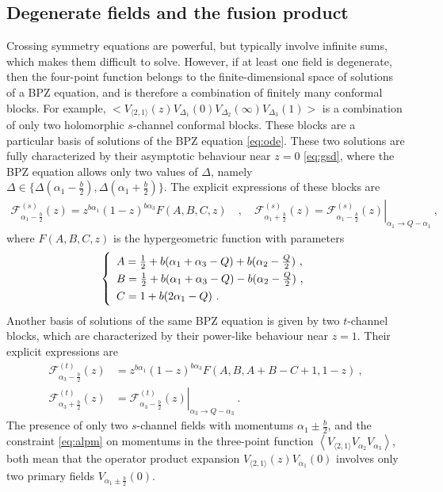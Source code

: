 \documentclass[12pt, a4paper]{article}
\theoremstyle{break}
\begin{document}
\subsection{Degenerate fields and the fusion product}

Crossing symmetry equations are powerful, but typically involve infinite sums, which makes them difficult to solve.
However, if at least one field is degenerate, then the four-point function belongs to the finite-dimensional space of solutions of a BPZ equation, and is therefore a combination of finitely many conformal blocks. 
For example,
$\Big< V_{\langle 2, 1 \rangle}(z) V_{\Delta_1}(0)V_{\Delta_2}(\infty)V_{\Delta_3}(1) \Big>$ is a combination of only two holomorphic $s$-channel conformal blocks.
These blocks are a particular basis of solutions of the BPZ equation \eqref{eq:ode}.
These two solutions are fully characterized by their asymptotic behaviour near $z=0$ \eqref{eq:gsd}, where the BPZ equation allows only two values of $\Delta$, namely $\Delta\in\{\Delta(\alpha_1-\frac{b}{2}),\Delta(\alpha_1+\frac{b}{2})\}$.
The explicit expressions of these blocks are
\begin{align}
\mathcal{F}^{(s)}_{\alpha_1-\frac{b}{2}}(z) = z^{b\alpha_1} (1-z)^{b\alpha_3} F(A,B,C,z)\quad , \quad 
 \mathcal{F}^{(s)}_{\alpha_1+\frac{b}{2}}(z) = \left. \mathcal{F}^{(s)}_{\alpha_1-\frac{b}{2}}(z) \right|_{\alpha_1\to Q-\alpha_1} \ ,
\label{gpm}
\end{align}
where $F(A,B,C,z)$ is the hypergeometric function with parameters
\begin{align}
\renewcommand{\arraystretch}{1.3}
\left\{\begin{array}{l}   A = \frac12 + b(\alpha_1+\alpha_3-Q) + b(\alpha_2-\tfrac{Q}{2}) \ , \\
      B = \frac12 + b(\alpha_1+\alpha_3-Q) - b(\alpha_2-\tfrac{Q}{2}) \ , \\
      C = 1 + b(2\alpha_1-Q) \ .
\end{array}\right. 
\label{abc}
\end{align}
Another basis of solutions of the same BPZ equation is given by two $t$-channel blocks, which are characterized by their power-like behaviour near $z=1$. Their explicit expressions are 
\begin{align}
 \mathcal{F}^{(t)}_{\alpha_3-\frac{b}{2}}(z) &= z^{b\alpha_1} (1-z)^{b\alpha_3} F(A,B,A+B-C+1,1-z)\ ,
 \nonumber \\
 \mathcal{F}^{(t)}_{\alpha_3+\frac{b}{2}}(z) &= \left. \mathcal{F}^{(t)}_{\alpha_3-\frac{b}{2}}(z) \right|_{\alpha_3\to Q-\alpha_3} \ .
\end{align}
The presence of only two $s$-channel fields with momentums $\alpha_1\pm \frac{b}{2}$, and the constraint \eqref{eq:alpm} on momentums in the three-point function $\left<V_{\langle 2,1\rangle}V_{\alpha_2}V_{\alpha_3}\right>$, both mean that the operator product expansion $V_{\langle 2, 1 \rangle}(z) V_{\alpha_1}(0)$ involves only two primary fields $V_{\alpha_1\pm \frac{b}{2}}(0)$. 
\end{document}
